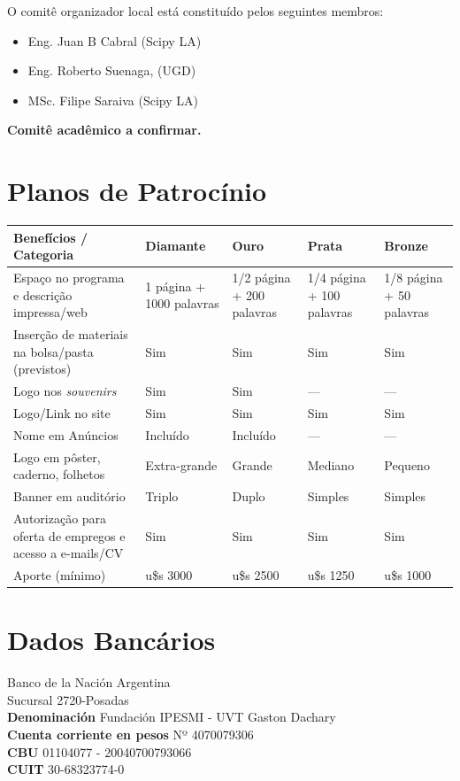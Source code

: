 \documentclass[11pt,a4paper]{report}
\begin{document}
O comitê organizador local está constituído pelos seguintes membros:\\

\begin{itemize}[nolistsep]
    \item Eng. Juan B Cabral (Scipy LA)
    \item Eng. Roberto Suenaga, (UGD)
    \item MSc. Filipe Saraiva (Scipy LA)
\end{itemize}

\textbf{Comitê acadêmico a confirmar.}

\section*{Planos de Patrocínio}
\begin{center}

\begin{tabular}{|p{4cm}|p{2.5cm}|p{2.5cm}|p{2.5cm}|p{2.5cm}|}
\hline
Benefícios / Categoria & Diamante & Ouro  & Prata & Bronze \\
\hline
Espaço no programa e descrição impressa/web & 1 página +
1000 palavras & 1/2 página + 200 palavras & 1/4 página + 100 palavras &  1/8 página + 50 palavras\\
\hline
Inserção de materiais na bolsa/pasta (previstos) & Sim & Sim & Sim & Sim \\
\hline
Logo nos \textit{souvenirs} & Sim & Sim & --- & --- \\
\hline
Logo/Link no site & Sim & Sim & Sim & Sim \\
\hline
Nome em Anúncios & Incluído & Incluído & --- & --- \\
\hline
Logo em pôster, caderno, folhetos & Extra-grande & Grande & Mediano & Pequeno \\
\hline
Banner em auditório & Triplo & Duplo & Simples & Simples \\
\hline
Autorização para oferta de empregos e acesso a e-mails/CV & Sim & Sim & Sim & Sim \\
\hline
Aporte (mínimo) & u\$s 3000 & u\$s 2500 & u\$s 1250 & u\$s 1000\\
\hline
\end{tabular}
\end{center}

\section*{Dados Bancários}
\noindent Banco de la Nación Argentina \\
Sucursal 2720-Posadas \\
\textbf{Denominación} Fundación IPESMI - UVT Gaston Dachary \\
\textbf{Cuenta corriente en pesos} Nº 4070079306 \\
\textbf{CBU} 01104077 - 20040700793066 \\
\textbf{CUIT} 30-68323774-0 \\
\end{document}
